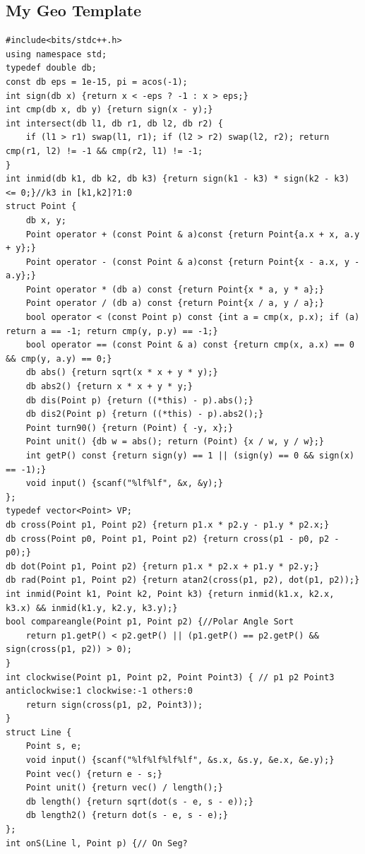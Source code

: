 \documentclass[twoside]{article}
\begin{document}
\subsection{My Geo Template}
\begin{lstlisting}
#include<bits/stdc++.h>
using namespace std;
typedef double db;
const db eps = 1e-15, pi = acos(-1);
int sign(db x) {return x < -eps ? -1 : x > eps;}
int cmp(db x, db y) {return sign(x - y);}
int intersect(db l1, db r1, db l2, db r2) {
    if (l1 > r1) swap(l1, r1); if (l2 > r2) swap(l2, r2); return cmp(r1, l2) != -1 && cmp(r2, l1) != -1;
}
int inmid(db k1, db k2, db k3) {return sign(k1 - k3) * sign(k2 - k3) <= 0;}//k3 in [k1,k2]?1:0
struct Point {
    db x, y;
    Point operator + (const Point & a)const {return Point{a.x + x, a.y + y};}
    Point operator - (const Point & a)const {return Point{x - a.x, y - a.y};}
    Point operator * (db a) const {return Point{x * a, y * a};}
    Point operator / (db a) const {return Point{x / a, y / a};}
    bool operator < (const Point p) const {int a = cmp(x, p.x); if (a) return a == -1; return cmp(y, p.y) == -1;}
    bool operator == (const Point & a) const {return cmp(x, a.x) == 0 && cmp(y, a.y) == 0;}
    db abs() {return sqrt(x * x + y * y);}
    db abs2() {return x * x + y * y;}
    db dis(Point p) {return ((*this) - p).abs();}
    db dis2(Point p) {return ((*this) - p).abs2();}
    Point turn90() {return (Point) { -y, x};}
    Point unit() {db w = abs(); return (Point) {x / w, y / w};}
    int getP() const {return sign(y) == 1 || (sign(y) == 0 && sign(x) == -1);}
    void input() {scanf("%lf%lf", &x, &y);}
};
typedef vector<Point> VP;
db cross(Point p1, Point p2) {return p1.x * p2.y - p1.y * p2.x;}
db cross(Point p0, Point p1, Point p2) {return cross(p1 - p0, p2 - p0);}
db dot(Point p1, Point p2) {return p1.x * p2.x + p1.y * p2.y;}
db rad(Point p1, Point p2) {return atan2(cross(p1, p2), dot(p1, p2));}
int inmid(Point k1, Point k2, Point k3) {return inmid(k1.x, k2.x, k3.x) && inmid(k1.y, k2.y, k3.y);}
bool compareangle(Point p1, Point p2) {//Polar Angle Sort
    return p1.getP() < p2.getP() || (p1.getP() == p2.getP() && sign(cross(p1, p2)) > 0);
}
int clockwise(Point p1, Point p2, Point Point3) { // p1 p2 Point3 anticlockwise:1 clockwise:-1 others:0
    return sign(cross(p1, p2, Point3));
}
struct Line {
    Point s, e;
    void input() {scanf("%lf%lf%lf%lf", &s.x, &s.y, &e.x, &e.y);}
    Point vec() {return e - s;}
    Point unit() {return vec() / length();}
    db length() {return sqrt(dot(s - e, s - e));}
    db length2() {return dot(s - e, s - e);}
};
int onS(Line l, Point p) {// On Seg?

\end{lstlisting}
\end{document}
